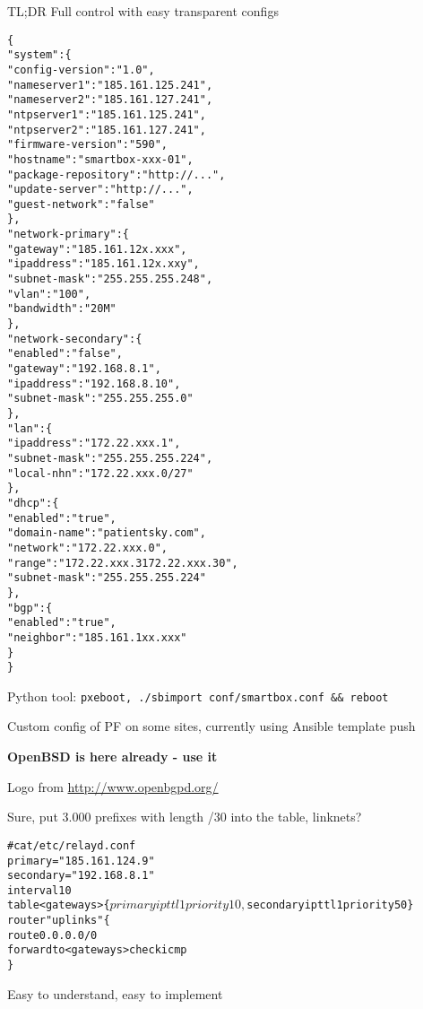 \documentclass[18pt,landscape,a4paper,footrule]{foils}
\begin{document}
TL;DR Full control with easy transparent configs


\begin{multicols}{2}
\begin{alltt}\scriptsize
\{
    "system": \{
        "config-version": "1.0",
        "nameserver1": "185.161.125.241",
        "nameserver2": "185.161.127.241",
        "ntpserver1": "185.161.125.241",
        "ntpserver2": "185.161.127.241",
        "firmware-version": "590",
        "hostname": "smartbox-xxx-01",
        "package-repository": "http://...",
        "update-server": "http://...",
        "guest-network": "false"
    \},
    "network-primary": \{
        "gateway": "185.161.12x.xxx",
        "ipaddress": "185.161.12x.xxy",
        "subnet-mask": "255.255.255.248",
        "vlan": "100",
        "bandwidth": "20M"
    \},
    "network-secondary": \{
        "enabled": "false",
        "gateway": "192.168.8.1",
        "ipaddress": "192.168.8.10",
        "subnet-mask": "255.255.255.0"
    \},
    "lan": \{
        "ipaddress": "172.22.xxx.1",
        "subnet-mask": "255.255.255.224",
        "local-nhn": "172.22.xxx.0/27"
    \},
    "dhcp": \{
        "enabled": "true",
        "domain-name": "patientsky.com",
        "network": "172.22.xxx.0",
        "range": "172.22.xxx.3 172.22.xxx.30",
        "subnet-mask": "255.255.255.224"
    \},
    "bgp": \{
        "enabled": "true",
        "neighbor": "185.161.1xx.xxx"
    \}
\}
\end{alltt}
\end{multicols}

Python tool: \verb+pxeboot, ./sbimport conf/smartbox.conf && reboot+

Custom config of PF on some sites, currently using Ansible template push


\begin{center}
\vskip 5mm
{\color{titlecolor}\LARGE \bf OpenBSD is here already - use it}
\vskip 5mm

Logo from \url{http://www.openbgpd.org/}

\end{center}



\centerline{Sure, put 3.000 prefixes with length /30 into the table, linknets?}


\begin{alltt}\footnotesize
# cat /etc/relayd.conf
primary = "185.161.124.9"
secondary = "192.168.8.1"
interval 10
table <gateways> \{ $primary ip ttl 1 priority 10, $secondary ip ttl 1 priority 50 \}
router "uplinks" \{
        route 0.0.0.0/0
        forward to <gateways> check icmp
\}
\end{alltt}

Easy to understand, easy to implement
\end{document}
